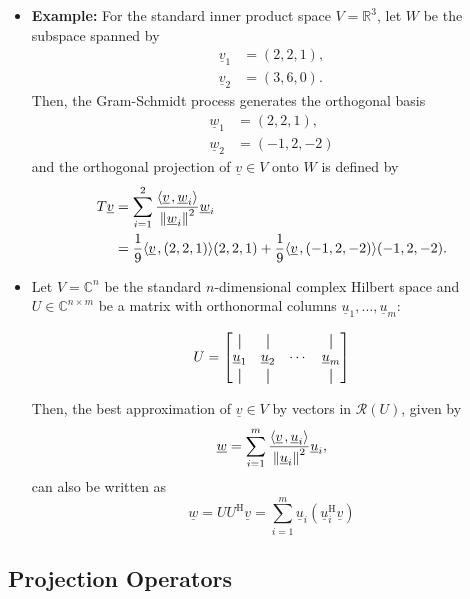 \documentclass[11pt,twoside]{report}
\newcommand{\bbC}{{\mathbb{C}}}
\newcommand{\vecnot}{\underline}
\newcommand{\Herm}{{\mathrm{H}}}
\newcommand{\inner}[2]{{\left\langle #1 \mskip2mu , #2 \right\rangle}}
\begin{document}
\begin{itemize}
\item \textbf{Example:} 
For the standard inner product space $V = \mathbb{R}^3$, let $W$ be the subspace spanned by
\begin{align*}
\vecnot{v}_1 &= (2,2,1), \\
\vecnot{v}_2 &= (3,6,0).
\end{align*}
Then, the Gram-Schmidt process generates the orthogonal basis
\begin{align*}
\vecnot{w}_1 &= (2,2,1), \\
\vecnot{w}_2 &= (-1,2,-2)
\end{align*}
and the orthogonal projection of $\vecnot{v} \in V$ onto $W$ is defined by \vspace{-2mm}
\begin{align*}
T \vecnot{v} &= \sum_{i=1}^2 \frac{ \inner{ \vecnot{v} }{ \vecnot{w}_i } }{ \left\| \vecnot{w}_i \right\|^2 } \vecnot{w}_i \\ &= \frac{1}{9} \inner{ \vecnot{v} }{ (2,2,1) } (2,2,1) + \frac{1}{9} \inner{ \vecnot{v} }{ (-1,2,-2) } (-1,2,-2).
\end{align*}

\newcommand*{\vertbar}{\rule[-1ex]{0.5pt}{2.5ex}}
\item 
Let $V = \bbC^n$ be the standard $n$-dimensional complex Hilbert space and $U \in \bbC^{n\times m}$ be a matrix with orthonormal columns $\vecnot{u}_1,\ldots,\vecnot{u}_m$:

\[ U = \begin{bmatrix} \vertbar & \vertbar & & \vertbar \\ \vecnot{u}_1 & \vecnot{u}_2 & \cdots & \vecnot{u}_m \\ \vertbar & \vertbar & & \vertbar \end{bmatrix} \]

\vspace{4mm}

Then, the best approximation of $\vecnot{v}\in V$ by vectors in $\mathcal{R}(U)$, given by
\begin{equation*}
\vecnot{w} = \sum_{i=1}^m \frac{ \inner{ \vecnot{v} }{ \vecnot{u}_i } }{ \left\| \vecnot{u}_i \right\|^2 } \vecnot{u}_i,
\end{equation*}
can also be written as
\[
 \vecnot{w} = U U^\Herm \vecnot{v} = \sum_{i=1}^m \vecnot{u}_i (\vecnot{u}_i^\Herm \vecnot{v})
  \]


\end{itemize}

\subsection{Projection Operators}
\end{document}
